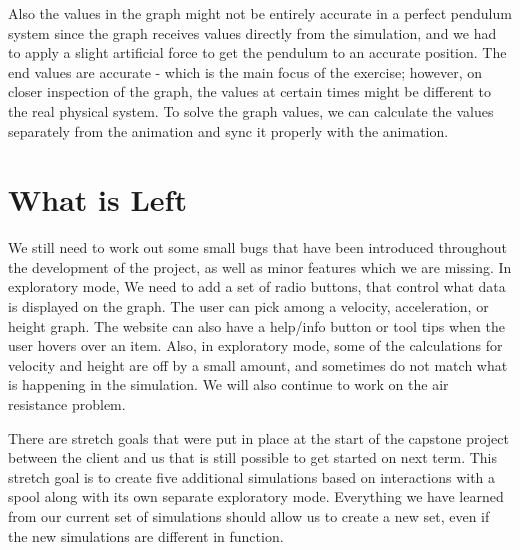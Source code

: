 \documentclass[onecolumn, draftclsnofoot,10pt, compsoc]{IEEEtran}
\begin{document}
\noindent
Also the values in the graph might not be entirely accurate in a perfect pendulum system since the graph receives values directly from the simulation, and we had to apply a slight artificial force to get the pendulum to an accurate position. The end values are accurate - which is the main focus of the exercise; however, on closer inspection of the graph, the values at certain times might be different to the real physical system.  To solve the graph values, we can calculate the values separately from the animation and sync it properly with the animation.

\section{What is Left}
We still need to work out some small bugs that have been introduced throughout the development of the project, as well as minor features which we are missing. In exploratory mode, We need to add a set of radio buttons, that control what data is displayed on the graph. The user can pick among a velocity, acceleration, or height graph. The website can also have a help/info button or tool tips when the user hovers over an item. Also, in exploratory mode, some of the calculations for velocity and height are off by a small amount, and sometimes do not match what is happening in the simulation. We will also continue to work on the air resistance problem. 


\noindent 
There are stretch goals that were put in place at the start of the capstone project between the client and us that is still possible to get started on next term. This stretch goal is to create five additional simulations based on interactions with a spool along with its own separate exploratory mode. Everything we have learned from our current set of simulations should allow us to create a new set, even if the new simulations are different in function.
\end{document}
